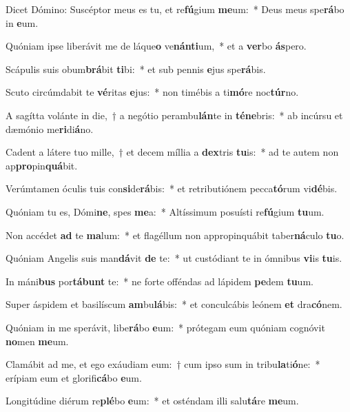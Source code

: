 \item Dicet Dómino: Suscéptor meus es tu, et re\textbf{fú}gium \textbf{me}um:~* Deus meus spe\textbf{rá}bo in \textbf{e}um.
\item Quóniam ipse liberávit me de láque\textbf{o} ve\textbf{nán}\textbf{ti}um,~* et a \textbf{ver}bo \textbf{ás}pero.
\item Scápulis suis obum\textbf{brá}bit \textbf{ti}bi:~* et sub pennis \textbf{e}jus spe\textbf{rá}bis.
\item Scuto circúmdabit te \textbf{vé}ritas \textbf{e}jus:~* non timébis a ti\textbf{mó}re noc\textbf{túr}no.
\item A sagítta volánte in die,~† a negótio perambu\textbf{lán}te in \textbf{té}\textbf{ne}bris:~* ab incúrsu et dæmónio me\textbf{ri}di\textbf{á}no.
\item Cadent a látere tuo mille,~† et decem míllia a \textbf{dex}tris \textbf{tu}is:~* ad te autem non ap\textbf{pro}pin\textbf{quá}bit.
\item Verúmtamen óculis tuis con\textbf{si}de\textbf{rá}bis:~* et retributiónem pecca\textbf{tó}rum vi\textbf{dé}bis.
\item Quóniam tu es, Dómi\textbf{ne}, spes \textbf{me}a:~* Altíssimum posuísti re\textbf{fú}gium \textbf{tu}um.
\item Non accédet \textbf{ad} te \textbf{ma}lum:~* et flagéllum non appropinquábit taber\textbf{ná}culo \textbf{tu}o.
\item Quóniam Angelis suis man\textbf{dá}vit \textbf{de} te:~* ut custódiant te in ómnibus \textbf{vi}is \textbf{tu}is.
\item In máni\textbf{bus} por\textbf{tá}\textbf{bunt} te:~* ne forte offéndas ad lápidem \textbf{pe}dem \textbf{tu}um.
\item Super áspidem et basilíscum \textbf{am}bu\textbf{lá}bis:~* et conculcábis leónem \textbf{et} dra\textbf{có}nem.
\item Quóniam in me sperávit, libe\textbf{rá}bo \textbf{e}um:~* prótegam eum quóniam cognóvit \textbf{no}men \textbf{me}um.
\item Clamábit ad me, et ego exáudiam eum:~† cum ipso sum in tribu\textbf{la}ti\textbf{ó}ne:~* erípiam eum et glorifi\textbf{cá}bo \textbf{e}um.
\item Longitúdine diérum re\textbf{plé}bo \textbf{e}um:~* et osténdam illi salu\textbf{tá}re \textbf{me}um.
